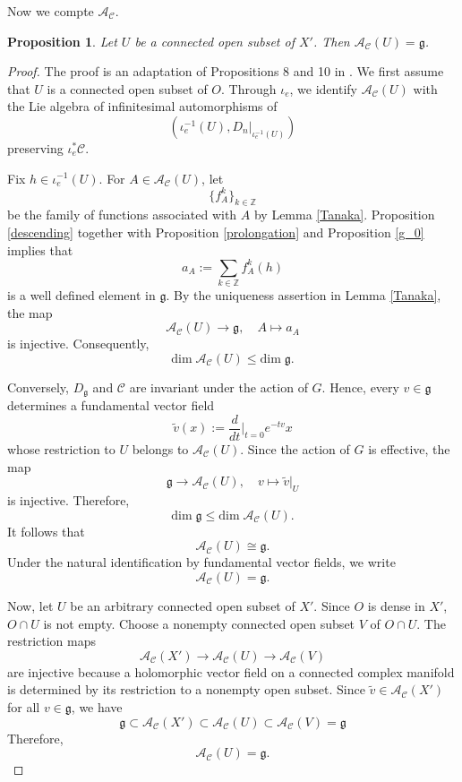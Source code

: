 \documentclass{amsart}
\newtheorem{proposition}[theorem]{Proposition}
\theoremstyle{definition}
\theoremstyle{remark}
\newcommand{\Z}{\mathbb{Z}}
\newcommand{\g}{\mathfrak{g}}
\begin{document}
Now we compte $\mathcal{A}_\mathscr{C}$.

\begin{proposition}
\label{infinitesimal automorphism}
Let $U$ be a connected open subset of $X'$. Then $\mathcal{A}_\mathscr{C}(U) = \g$.
\end{proposition}
\begin{proof}
The proof is an adaptation of Propositions 8 and 10 in \cite{C}. We first assume that \(U\) is a connected open subset of \(O\). Through $\iota_e$, we identify $\mathcal{A}_\mathscr{C}(U)$ with the Lie algebra of infinitesimal automorphisms of 
\[(\iota_e^{-1}(U), D_n|_{\iota_e^{-1}(U)})\]
preserving $\iota_e^*\mathscr{C}$.
 
Fix $h \in \iota_e^{-1}(U)$. For $A \in \mathcal{A}_\mathscr{C}(U)$, let 
\[\{f_A^k\}_{k \in \Z}\]
be the family of functions associated with $A$ by Lemma \ref{Tanaka}. Proposition \ref{descending} together with Proposition \ref{prolongation} and Proposition \ref{g_0} implies that
\[a_A := \sum_{k \in \Z} f_A^k(h)\]
is a well defined element in $\g$. By the uniqueness assertion in Lemma \ref{Tanaka}, the map
\[\mathcal{A}_\mathscr{C}(U) \to \g, \quad A \mapsto a_A\]
is injective. Consequently, 
\[\mathrm{dim}\;\mathcal{A}_\mathscr{C}(U) \leq \mathrm{dim}\; \g.\]

Conversely, $D_\g$ and $\mathscr{C}$ are invariant under the action of $G$. Hence, every $v \in \g$ determines a fundamental vector field
\[\tilde{v}(x) := \frac{d}{dt}\big|_{t=0} e^{-tv} x \]
whose restriction to $U$ belongs to $\mathcal{A}_\mathscr{C}(U)$. Since the action of $G$ is effective, the map
\[\g \to \mathcal{A}_\mathscr{C}(U), \quad v \mapsto \tilde{v}|_U\]
is injective. Therefore,
\[\mathrm{dim}\; \g \leq \mathrm{dim}\;\mathcal{A}_\mathscr{C}(U).\]
It follows that 
\[\mathcal{A}_\mathscr{C}(U) \cong \g.\]
Under the natural identification by fundamental vector fields, we write
\[\mathcal{A}_\mathscr{C}(U) = \g.\]

Now, let $U$ be an arbitrary connected open subset of $X'$. Since $O$ is dense in $X'$, $O \cap U$ is not empty. Choose a nonempty connected open subset $V$ of $O \cap U$. The restriction maps
\[\mathcal{A}_\mathscr{C}(X') \to \mathcal{A}_\mathscr{C}(U) \to \mathcal{A}_\mathscr{C}(V)\]
are injective because a holomorphic vector field on a connected complex manifold is determined by its restriction to a nonempty open subset. Since $\tilde{v} \in \mathcal{A}_\mathscr{C}(X')$ for all $v \in \g$, we have 
\[\g \subset \mathcal{A}_\mathscr{C}(X') \subset \mathcal{A}_\mathscr{C}(U) \subset \mathcal{A}_\mathscr{C}(V) = \g\] 
Therefore, 
\[\mathcal{A}_\mathscr{C}(U) = \g.\]
\end{proof}
\end{document}

